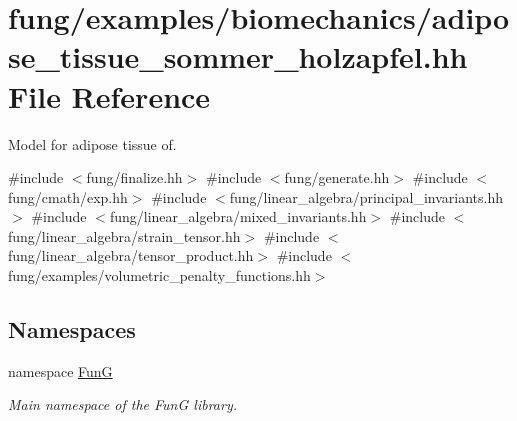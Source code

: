 \hypertarget{adipose__tissue__sommer__holzapfel_8hh}{\section{fung/examples/biomechanics/adipose\-\_\-tissue\-\_\-sommer\-\_\-holzapfel.hh \-File \-Reference}
\label{adipose__tissue__sommer__holzapfel_8hh}
}


\-Model for adipose tissue of.  


{\ttfamily \#include $<$fung/finalize.\-hh$>$}\*
{\ttfamily \#include $<$fung/generate.\-hh$>$}\*
{\ttfamily \#include $<$fung/cmath/exp.\-hh$>$}\*
{\ttfamily \#include $<$fung/linear\-\_\-algebra/principal\-\_\-invariants.\-hh$>$}\*
{\ttfamily \#include $<$fung/linear\-\_\-algebra/mixed\-\_\-invariants.\-hh$>$}\*
{\ttfamily \#include $<$fung/linear\-\_\-algebra/strain\-\_\-tensor.\-hh$>$}\*
{\ttfamily \#include $<$fung/linear\-\_\-algebra/tensor\-\_\-product.\-hh$>$}\*
{\ttfamily \#include $<$fung/examples/volumetric\-\_\-penalty\-\_\-functions.\-hh$>$}\*
\subsection*{\-Namespaces}
\begin{DoxyCompactItemize}
\item 
namespace \hyperlink{namespaceFunG}{\-Fun\-G}
\begin{DoxyCompactList}\small\item\em \-Main namespace of the \-Fun\-G library. \end{DoxyCompactList}\end{DoxyCompactItemize}
